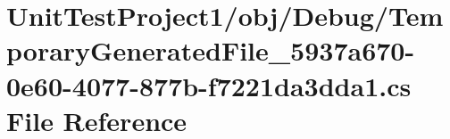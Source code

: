 \hypertarget{_unit_test_project1_2obj_2_debug_2_temporary_generated_file__5937a670-0e60-4077-877b-f7221da3dda1_8cs}{}\section{Unit\+Test\+Project1/obj/\+Debug/\+Temporary\+Generated\+File\+\_\+5937a670-\/0e60-\/4077-\/877b-\/f7221da3dda1.cs File Reference}
\label{_unit_test_project1_2obj_2_debug_2_temporary_generated_file__5937a670-0e60-4077-877b-f7221da3dda1_8cs}
